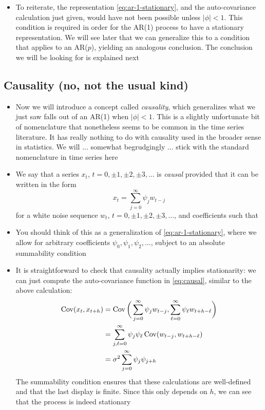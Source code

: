 \documentclass{article}
\begin{document}
\begin{itemize}
\item To reiterate, the representation \eqref{eq:ar-1-stationary}, and the
  auto-covariance calculation just given, would have not been possible unless
  $|\phi| < 1$. This condition is required in order for the AR(1) process to
  have a stationary representation. We will see later that we can generalize
  this to a condition that applies to an AR($p$), yielding an analogous
  conclusion. The conclusion we will be looking for is explained next  
\end{itemize}

\subsection{Causality (no, not the usual kind)}

\begin{itemize}
\item Now we will introduce a concept called \emph{causality}, which generalizes
  what we just saw falls out of an AR(1) when $|\phi| < 1$. This is a slightly
  unfortunate bit of nomenclature that nonetheless seems to be common in the
  time series literature. It has really nothing to do with causality used in the
  broader sense in statistics. We will ... somewhat begrudgingly ... stick with
  the standard nomenclature in time series here  

\item We say that a series $x_t$, $t = 0, \pm 1, \pm 2, \pm 3, \dots$ is
  \emph{causal} provided that it can be written in the form
  \begin{equation}
  \label{eq:causal}
  x_t = \sum_{j=0}^\infty \psi_j w_{t-j}
  \end{equation}
  for a white noise sequence $w_t$, $t = 0, \pm 1, \pm 2, \pm 3, \dots$, and
  coefficients such that   

\item You should think of this as a generalization of
  \eqref{eq:ar-1-stationary}, where we allow for arbitrary coefficients
  $\psi_0,\psi_1,\psi_2,\dots$, subject to an absolute summability condition  

\item It is straightforward to check that causality actually implies
  stationarity: we can just compute the auto-covariance function in
  \eqref{eq:causal}, similar to the above calculation:
    \begin{align*}
  \operatorname{Cov}(x_t, x_{t+h}) &= \operatorname{Cov}\bigg( \sum_{j=0}^\infty \psi_j w_{t-j}, 
  \sum_{\ell=0}^\infty \psi_\ell w_{t+h-\ell} \bigg) \\
  &= \sum_{j,\ell=0}^\infty \psi_j \psi_\ell \operatorname{Cov}( w_{t-j}, w_{t+h-\ell} ) \\
  &= \sigma^2 \sum_{j=0}^\infty \psi_j \psi_{j+h}
  \end{align*}
  The summability condition ensures that these calculations are well-defined and
  that the last display is finite. Since this only depends on $h$, we can see
  that the process is indeed stationary


\end{itemize}
\end{document}

